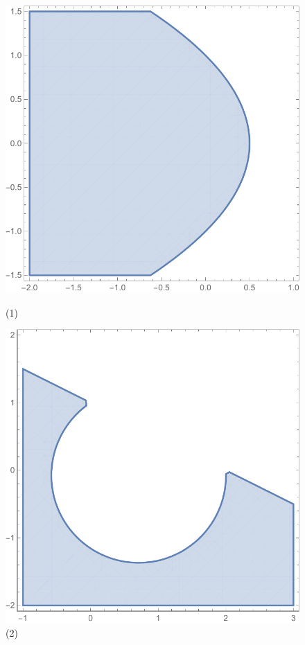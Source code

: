 \documentclass{phyasgn}
\begin{document}
\begin{sol}[4]
    
\begin{figure}[htbp]
    \centering
    \begin{minipage}[b]{0.45\textwidth}
        \centering
        \includegraphics[width=\textwidth]{1.4(1).pdf}
        \caption{(1)}
    \end{minipage}
    \hspace{0.05\textwidth}
    \begin{minipage}[b]{0.45\textwidth}
        \centering
        \includegraphics[width=\textwidth]{1.4(2).pdf}
        \caption{(2)}
    \end{minipage}
\end{figure}
\end{sol}\par
\end{document}
